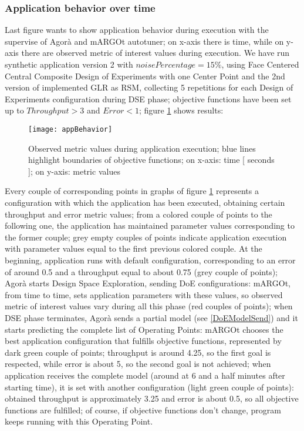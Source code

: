 \subsubsection{Application behavior over time}

Last figure wants to show application behavior during execution with the supervise of Agorà and mARGOt autotuner; on x-axis there is time, while on y-axis there are observed metric of interest values during execution. We have run synthetic application version 2 with $noisePercentage = 15\%$, using Face Centered Central Composite Design of Experiments with one Center Point and the 2nd version of implemented GLR as RSM, collecting 5 repetitions for each Design of Experiments configuration during DSE phase; objective functions have been set up to $Throughput > 3$ and $Error < 1$; figure \ref{fig::appBeh} shows results:

\begin{figure}[h]

    \centering
    \texttt{[image: appBehavior]}
    \caption[Observed metric values during application execution]{Observed metric values during application execution; blue lines highlight boundaries of objective functions; on x-axis: time [ seconds ]; on y-axis: metric values}
    \label{fig::appBeh}
    
\end{figure}

Every couple of corresponding points in graphs of figure \ref{fig::appBeh} represents a configuration with which the application has been executed, obtaining certain throughput and error metric values; from a colored couple of points to the following one, the application has maintained parameter values corresponding to the former couple; grey empty couples of points indicate application execution with parameter values equal to the first previous colored couple. At the beginning, application runs with default configuration, corresponding to an error of around 0.5 and a throughput equal to about 0.75 (grey couple of points); Agorà starts Design Space Exploration, sending DoE configurations: mARGOt, from time to time, sets application parameters with these values, so observed metric of interest values vary during all this phase (red couples of points); when DSE phase terminates, Agorà sends a partial model (see \ref{DoEModelSend}) and it starts predicting the complete list of Operating Points: mARGOt chooses the best application configuration that fulfills objective functions, represented by dark green couple of points; throughput is around 4.25, so the first goal is respected, while error is about 5, so the second goal is not achieved; when application receives the complete model (around at 6 and a half minutes after starting time), it is set with another configuration (light green couple of points): obtained throughput is approximately 3.25 and error is about 0.5, so all objective functions are fulfilled; of course, if objective functions don't change, program keeps running with this Operating Point.




